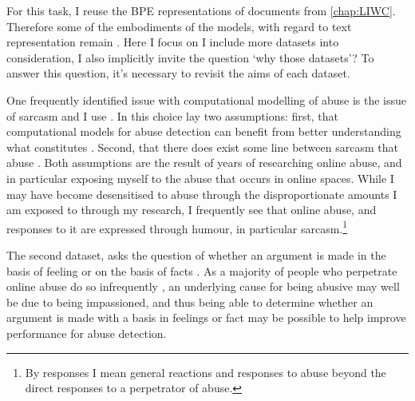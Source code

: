 For this task, I reuse the BPE representations of documents from \autoref{chap:LIWC}.
Therefore some of the embodiments of the models, with regard to text representation remain .
Here I focus on 
 I include more datasets into consideration, I also implicitly invite the question `why those datasets'?
To answer this question, it's necessary to revisit the aims of each dataset.

One frequently identified issue with computational modelling of abuse is the issue of sarcasm \citep{Rottger:2021} and I use \citet{Oraby_sarcasm:2016}.
In this choice lay two assumptions: first, that computational models for abuse detection can benefit from better understanding what constitutes .
Second, that there does exist some line between  sarcasm  that  abuse .
Both assumptions are the result of years of researching online abuse, and in particular exposing myself to the abuse that occurs in online spaces.
While I may have become desensitised to abuse through the disproportionate amounts I am exposed to through my research, I frequently see that online abuse, and responses to it are expressed through humour, in particular sarcasm.\footnote{By responses I mean general reactions and responses to abuse beyond the direct responses to a perpetrator of abuse.}

The second dataset, asks the question of whether an argument is made in the basis of feeling or on the basis of facts \citep{Oraby_factfeel:2015}.
As a majority of people who perpetrate online abuse do so infrequently \citep{Waseem-Hovy:2016}, an underlying cause for being abusive may well be due to being impassioned, and thus being able to determine whether an argument is made with a basis in feelings or fact may be possible to help improve performance for abuse detection.


